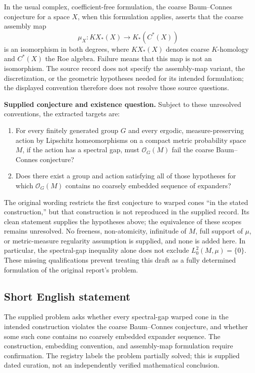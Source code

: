 \documentclass[11pt]{article}
\begin{document}
In the usual complex, coefficient-free formulation, the coarse Baum--Connes conjecture for a space \(X\), when this formulation applies, asserts that the coarse assembly map
\[
\mu_X:KX_*(X)\longrightarrow K_*(C^*(X))
\]
is an isomorphism in both degrees, where \(KX_*(X)\) denotes coarse \(K\)-homology and \(C^*(X)\) the Roe algebra. Failure means that this map is not an isomorphism. The source record does not specify the assembly-map variant, the discretization, or the geometric hypotheses needed for its intended formulation; the displayed convention therefore does not resolve those source questions.

\textbf{Supplied conjecture and existence question.} Subject to these unresolved conventions, the extracted targets are:
\begin{enumerate}
\item For every finitely generated group \(G\) and every ergodic, measure-preserving action by Lipschitz homeomorphisms on a compact metric probability space \(M\), if the action has a spectral gap, must \(\mathcal O_G(M)\) fail the coarse Baum--Connes conjecture?
\item Does there exist a group and action satisfying all of those hypotheses for which \(\mathcal O_G(M)\) contains no coarsely embedded sequence of expanders?
\end{enumerate}
The original wording restricts the first conjecture to warped cones ``in the stated construction,'' but that construction is not reproduced in the supplied record. Its clean statement supplies the hypotheses above; the equivalence of these scopes remains unresolved. No freeness, non-atomicity, infinitude of \(M\), full support of \(\mu\), or metric-measure regularity assumption is supplied, and none is added here. In particular, the spectral-gap inequality alone does not exclude \(L^2_0(M,\mu)=\{0\}\). These missing qualifications prevent treating this draft as a fully determined formulation of the original report's problem.
\subsection{Short English statement}
The supplied problem asks whether every spectral-gap warped cone in the intended construction violates the coarse Baum--Connes conjecture, and whether some such cone contains no coarsely embedded expander sequence. The construction, embedding convention, and assembly-map formulation require confirmation. The registry labels the problem partially solved; this is supplied dated curation, not an independently verified mathematical conclusion.
\end{document}
